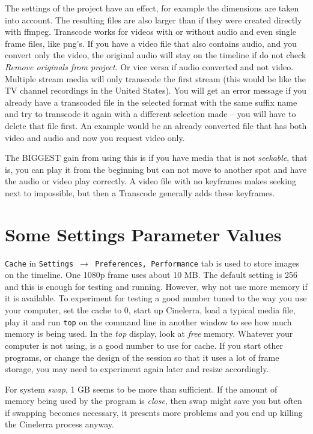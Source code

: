 The settings of the project have an effect, for example the dimensions are taken into account. The resulting files are also larger than if they were created directly with ffmpeg.
Transcode works for videos with or without audio and even single frame files, like png's.
If you have a video file that also contains audio, and you convert only the video, the original audio will stay on the timeline if do not check \textit{Remove originals from project}. Or vice versa if audio converted and not video.
Multiple stream media will only transcode the first stream (this would be like the TV channel recordings in the United States).
You will get an error message if you already have a transcoded file in the selected format with the same suffix name and try to transcode it again with a different selection made -- you will have to delete that file first. An example would be
an already converted file that has both video and audio and now you request video only. 

The BIGGEST gain from using this is if you have media that is not \textit{seekable}, that is, you can play it from the beginning but can not move to another spot and have the audio or video play correctly. A video file with no keyframes makes seeking next to impossible, but then a Transcode generally adds these keyframes. 

\section{Some Settings Parameter Values}%
\label{sec:settings_parameter_values}

\texttt{Cache} in \texttt{Settings $\rightarrow$ Preferences, Performance} tab is used to store images on the timeline.  One 1080p frame uses about 10 MB.  The default setting is 256 and this is enough for testing and running.  However, why not use more memory if it is available.   To experiment for testing a good number tuned to the way you use your computer, set the cache to 0, start up Cinelerra, load a typical media file, play it and run \texttt{top} on the command line in another window to see how much memory is being used.  In the \textit{top} display, look at \textit{free} memory.  Whatever your computer is not using, is a good number to use for cache.  If you start other programs, or change the design of the session so that it uses a lot of frame storage, you may need to experiment again later and resize accordingly.

For system \textit{swap}, 1 GB seems to be more than sufficient.  If the amount of memory being used by the program is \textit{close}, then swap might save you but often if swapping becomes necessary, it presents more problems and you end up killing the Cinelerra process anyway.

